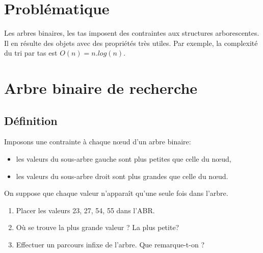 \documentclass[a4paper,11pt]{article}
\begin{document}
\section{Problématique}
Les arbres binaires, les tas imposent des contraintes aux structures arborescentes. Il en résulte des objets avec des propriétés très utiles. Par exemple, la complexité du tri par tas est $O(n) = n.log(n)$.
\begin{center}
\end{center}
\section{Arbre binaire de recherche}
\subsection{Définition}
Imposons une contrainte à chaque nœud d'un arbre binaire:
\begin{itemize}
    \item les valeurs du sous-arbre gauche sont plus petites que celle du nœud,
    \item les valeurs du sous-arbre droit sont plus grandes que celle du nœud.
\end{itemize}
\begin{center}
    \label{arbre}
\end{center}
\begin{aretenir}[Remarque]
    On suppose que chaque valeur n'apparaît qu'une seule fois dans l'arbre.
\end{aretenir}
\begin{activite}
    \begin{enumerate}
        \item Placer les valeurs 23, 27, 54, 55 dans l'ABR.
        \item Où se trouve la plus grande valeur ? La plus petite?
        \item Effectuer un parcours infixe de l'arbre. Que remarque-t-on ?
    \end{enumerate}
\end{activite}
\end{document}
